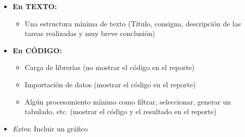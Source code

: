 \documentclass[
]{article}
\providecommand{\tightlist}{%
  \setlength{\itemsep}{0pt}\setlength{\parskip}{0pt}}
\begin{document}
\begin{itemize}
\tightlist
\item
  \textbf{En TEXTO:}

  \begin{itemize}
  \tightlist
  \item
    Una estructura mínima de texto (Título, consigna, descripción de las
    tareas realizadas y muy breve conclusión)
  \end{itemize}
\item
  \textbf{En CÓDIGO:}

  \begin{itemize}
  \tightlist
  \item
    Carga de librerías (no mostrar el código en el reporte)
  \item
    Importación de datos (mostrar el código en el reporte)
  \item
    Algún procesamiento mínimo como filtrar, seleccionar, generar un
    tabulado, etc. (mostrar el código y el resultado en el reporte)
  \end{itemize}
\item
  \emph{Extra}: Incluir un gráfico
\end{itemize}
\end{document}
